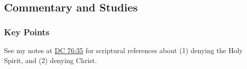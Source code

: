 	
	
	
\subsection{Commentary and Studies} %
	\label{DENY-COMMENTARY}

	\subsubsection{Key Points}
		\label{DENY-KEYS}
	
		\begin{compactitem}
			\item See my notes at \hyperref[DC76-35]{DC 76:35} for scriptural references about (1) denying the Holy Spirit, and (2) denying Christ.
		\end{compactitem}
		
